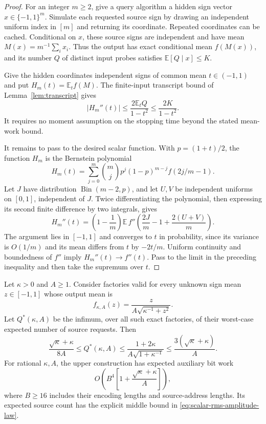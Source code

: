 \begin{proof}
For an integer $m\ge2$, give a query algorithm a hidden sign vector
$x\in\{-1,1\}^m$.  Simulate each requested source sign by drawing an
independent uniform index in $[m]$ and returning its coordinate.  Repeated
coordinates can be cached.  Conditional on $x$, these source signs are
independent and have mean $M(x)=m^{-1}\sum_i x_i$.  Thus the output
has exact conditional mean $f(M(x))$, and its number $Q$ of distinct
input probes satisfies $\mathbb E[Q\mid x]\le K$.

Give the hidden coordinates independent signs of common mean
$t\in(-1,1)$ and put $H_m(t)=\mathbb E_t f(M)$. The finite-input
transcript bound of Lemma~\ref{lem:transcript} gives
\[
 |H_m''(t)|\le\frac{2\mathbb E_tQ}{1-t^2}
             \le\frac{2K}{1-t^2}.
\]
It requires no moment assumption on the stopping time beyond the
stated mean-work bound.

It remains to pass to the desired scalar function.  With
$p=(1+t)/2$, the function $H_m$ is the Bernstein polynomial
\[
 H_m(t)=\sum_{j=0}^m\binom mjp^j(1-p)^{m-j}f(2j/m-1).
\]
Let $J$ have distribution $\operatorname{Bin}(m-2,p)$, and let
$U,V$ be independent uniforms on $[0,1]$, independent of $J$.
Twice differentiating the polynomial, then expressing its second
finite difference by two integrals, gives
\[
 H_m''(t)=\left(1-\frac1m\right)
 \mathbb E\,f''\!\left(\frac{2J}{m}-1+\frac{2(U+V)}m\right).
\]
The argument lies in $[-1,1]$ and converges to $t$ in probability,
since its variance is $O(1/m)$ and its mean differs from $t$ by
$-2t/m$.  Uniform continuity and boundedness of $f''$ imply
$H_m''(t)\to f''(t)$.  Pass to the limit in the preceding inequality
and then take the supremum over $t$.
\end{proof}

\begin{theorem}
\label{thm:scalar-rms-amplitude}
Let $\kappa>0$ and $A\ge1$.  Consider factories valid for every
unknown sign mean $z\in[-1,1]$ whose output mean is
\[
 f_{\kappa,A}(z)
 =\frac{z}{A\sqrt{\kappa^{-1}+z^2}}.
\]
Let $Q^*(\kappa,A)$ be the infimum, over all such exact factories,
of their worst-case expected number of source requests.  Then
\begin{equation}
 \frac{\sqrt\kappa+\kappa}{8A}
 \le Q^*(\kappa,A)
 \le\frac{1+2\kappa}{A\sqrt{1+\kappa^{-1}}}
 \le\frac{3(\sqrt\kappa+\kappa)}A.
 \label{eq:scalar-rms-amplitude-law}
\end{equation}
For rational $\kappa,A$, the upper construction has expected auxiliary
bit work
\[
 O\!\left(B^4\left[1+\frac{\sqrt\kappa+\kappa}{A}\right]\right),
\]
where $B\ge16$ includes their encoding lengths and source-address
lengths.  Its expected source count has the explicit middle bound in
\eqref{eq:scalar-rms-amplitude-law}.
\end{theorem}
